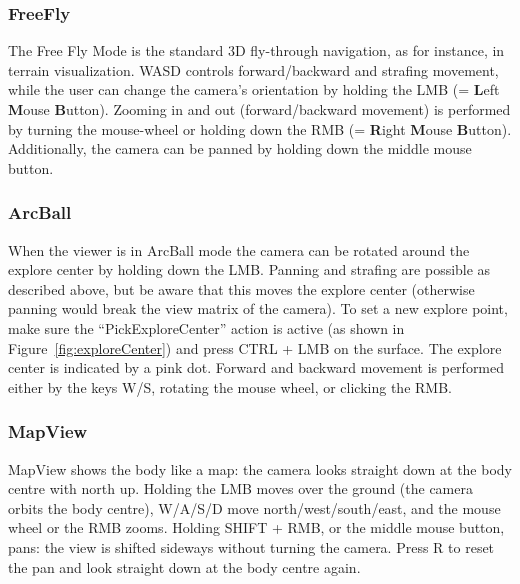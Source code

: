 \subsubsection{FreeFly}

The Free Fly Mode is the standard 3D fly-through navigation, as for instance, in terrain visualization. WASD controls forward/backward and strafing movement, while the user can change the camera's orientation by holding the LMB (= \textbf{L}eft \textbf{M}ouse \textbf{B}utton). Zooming in and out (forward/backward movement) is performed by turning the mouse-wheel or holding down the RMB (= \textbf{R}ight \textbf{M}ouse \textbf{B}utton). Additionally, the camera can be panned by holding down the middle mouse button.

\subsubsection{ArcBall}

When the viewer is in ArcBall mode the camera can be rotated around the explore center by holding down the LMB. Panning and strafing are possible as described above, but be aware that this moves the explore center (otherwise panning would break the view matrix of the camera). To set a new explore point, make sure the ``PickExploreCenter'' action is active (as shown in Figure~\ref{fig:exploreCenter}) and press CTRL + LMB on the surface. The explore center is indicated by a pink dot. Forward and backward movement is performed either by the keys W/S, rotating the mouse wheel, or clicking the RMB.

\subsubsection{MapView}

MapView shows the body like a map: the camera looks straight down at the body centre with north up. Holding the LMB moves over the ground (the camera orbits the body centre), W/A/S/D move north/west/south/east, and the mouse wheel or the RMB zooms. Holding SHIFT + RMB, or the middle mouse button, pans: the view is shifted sideways without turning the camera. Press R to reset the pan and look straight down at the body centre again.


